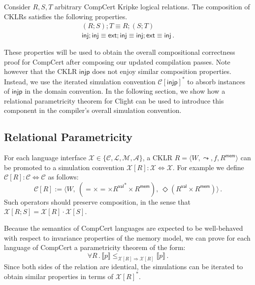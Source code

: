 \documentclass[acmsmall,timestamp,review,anonymous]{acmart}
\newcommand{\kw}[1]{\ensuremath{ \mathsf{#1} }}
\begin{document}
\begin{lemma}
Consider $R, S, T$ arbitrary CompCert Kripke logical relations.
The composition of CKLRs satisfies the following properties.
\begin{gather*}
  (R ; S) ; T \equiv R ; (S ; T) \\
  \kw{inj} ; \kw{inj} \equiv
    \kw{ext} ; \kw{inj} \equiv
    \kw{inj} ; \kw{ext} \equiv
    \kw{inj} \,.
\end{gather*}
\end{lemma}

These properties will be used to obtain the overall
compositional correctness proof for CompCert
after composing our updated compilation passes.
Note however that the CKLR $\kw{injp}$
does not enjoy similar composition properties.
Instead,
we use the iterated simulation convention $\mathcal{C}[\kw{injp}]^*$
to absorb instances of $\kw{injp}$ in the domain convention.
In the following section,
we show how a relational parametricity theorem for
Clight can be used to introduce this component
in the compiler's overall simulation convention.


\subsection{Relational Parametricity} %

For each language interface
$\mathcal{X} \in \{ \mathcal{C}, \mathcal{L}, \mathcal{M}, \mathcal{A} \}$,
a CKLR
$R = \langle W, {\leadsto}, f, R^\kw{mem} \rangle$ can be promoted to
a simulation convention
$\mathcal{X}[R] : \mathcal{X} \Leftrightarrow \mathcal{X}$.
For example
we define $\mathcal{C}[R] : \mathcal{C} \Leftrightarrow \mathcal{C}$
as follows:
\[
    \mathcal{C}[R] := \langle
      W, \:
      ({=} \times {=} \times {R^\kw{val}}^* \times R^\kw{mem}), \:
      \Diamond (R^\kw{val} \times R^\kw{mem})
    \rangle \,.
\]
Such operators should preserve composition,
in the sense that $\mathcal{X}[R ; S] = \mathcal{X}[R] \cdot \mathcal{X}[S]$.

Because the semantics of CompCert languages
are expected to be well-behaved with respect to
invariance properties of the memory model,
we can prove for each language of CompCert
a parametricity theorem of the form:
\[
    \forall R \,.\,
      \llbracket p \rrbracket
        \le_{\mathcal{X}[R] \Rightarrow \mathcal{X}[R]}
      \llbracket p \rrbracket \,.
\]
Since both sides of the relation are identical,
the simulations can be iterated
to obtain similar properties in terms of $\mathcal{X}[R]^*$.
\end{document}

